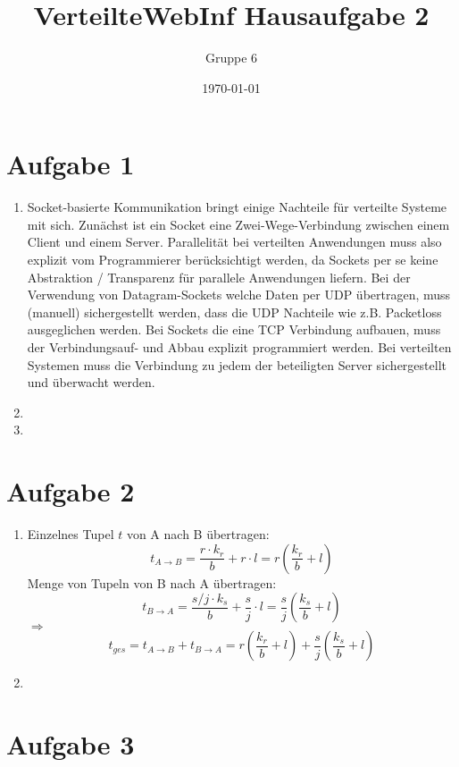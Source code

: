 \documentclass[a4paper]{article}
\author{Gruppe 6}
\title{\textbf{VerteilteWebInf Hausaufgabe 2}}
\date{\today}
\begin{document}
\maketitle

\section*{Aufgabe 1}
\begin{enumerate}[label=\alph*)]
\item Socket-basierte Kommunikation bringt einige Nachteile für verteilte Systeme mit sich. Zunächst ist ein Socket eine Zwei-Wege-Verbindung zwischen einem Client und einem Server. Parallelität bei verteilten Anwendungen muss also explizit vom Programmierer berücksichtigt werden, da Sockets per se keine Abstraktion / Transparenz für parallele Anwendungen liefern.  
Bei der Verwendung von Datagram-Sockets welche Daten per UDP übertragen, muss (manuell) sichergestellt werden, dass die UDP Nachteile wie z.B. Packetloss ausgeglichen werden. Bei Sockets die eine TCP Verbindung aufbauen, muss der Verbindungsauf- und Abbau explizit programmiert werden. Bei verteilten Systemen muss die Verbindung zu jedem der beteiligten Server sichergestellt und überwacht werden. 

\item
\item
\end{enumerate}

\section*{Aufgabe 2}
\begin{enumerate}[label=\alph*)]
\item Einzelnes Tupel $t$ von A nach B übertragen: 
\[t_{A\rightarrow B} = \frac{r\cdot k_r}{b}+r\cdot l = r\left(\frac{k_r}{b} + l \right)\]
Menge von Tupeln von B nach A übertragen:
\[t_{B\rightarrow A} = \frac{s/j\cdot k_s}{b}+\frac{s}{j}\cdot l = \frac{s}{j}\left(\frac{k_s}{b} +l\right)\]
$\Rightarrow$ \[t_{ges} = t_{A\rightarrow B} + t_{B\rightarrow A} =  r\left(\frac{k_r}{b} + l \right) +  \frac{s}{j}\left(\frac{k_s}{b} +l\right)\]

\item
\end{enumerate}

\section*{Aufgabe 3}
\end{document}
